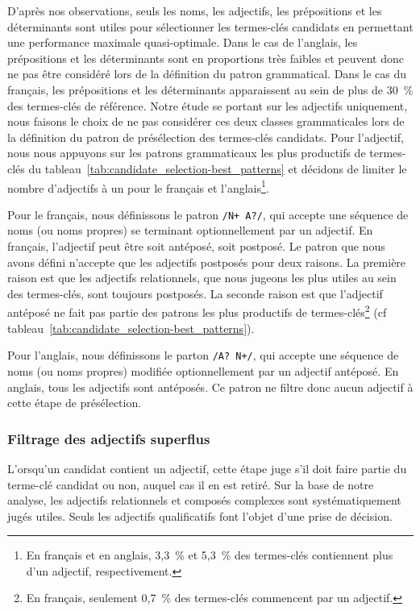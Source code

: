         D'après nos observations, seuls les noms, les adjectifs, les
        prépositions et les déterminants sont utiles pour sélectionner les
        termes-clés candidats en permettant une performance maximale
        quasi-optimale. Dans le cas de l'anglais, les prépositions et les
        déterminants sont en proportions très faibles et peuvent donc ne pas
        être considéré lors de la définition du patron grammatical. Dans le cas
        du français, les prépositions et les déterminants apparaissent au sein
        de plus de 30~\% des termes-clés de référence. Notre étude se portant
        sur les adjectifs uniquement, nous faisons le choix de ne pas considérer
        ces deux classes grammaticales lors de la définition du patron de
        présélection des termes-clés candidats. Pour l'adjectif, nous nous
        appuyons sur les patrons grammaticaux les plus productifs de termes-clés
        du tableau~\ref{tab:candidate_selection-best_patterns} et décidons de
        limiter le nombre d'adjectifs à un pour le français et
        l'anglais\footnote{En français et en anglais, 3,3~\% et 5,3~\% des
        termes-clés contiennent plus d'un adjectif, respectivement.}.
        
        Pour le français, nous définissons le patron \texttt{/N+ A?/}, qui
        accepte une séquence de noms (ou noms propres) se terminant
        optionnellement par un adjectif. En français, l'adjectif peut être soit
        antéposé, soit postposé. Le patron que nous avons défini n'accepte que
        les adjectifs postposés pour deux raisons. La première raison est que
        les adjectifs relationnels, que nous jugeons les
        plus utiles au sein des termes-clés, sont toujours postposés. La seconde
        raison est que l'adjectif antéposé ne fait pas partie des patrons les
        plus productifs de termes-clés\footnote{En français, seulement 0,7~\%
        des termes-clés commencent par un adjectif.} (cf
        tableau~\ref{tab:candidate_selection-best_patterns}).
        
        Pour l'anglais, nous définissons le parton \texttt{/A? N+/}, qui accepte
        une séquence de noms (ou noms propres) modifiée optionnellement par un
        adjectif antéposé. En anglais, tous les adjectifs sont antéposés. Ce
        patron ne filtre donc aucun adjectif à cette étape de présélection.

      \subsubsection{Filtrage des adjectifs superflus}
      \label{subsubsec:main:domain_independent_keyphrase_extraction-keyphrase_candidate_selection-modifiers_filtering-adjective_filtering}
        L'orsqu'un candidat contient un adjectif, cette étape juge s'il doit
        faire partie du terme-clé candidat ou non, auquel cas il  en est retiré.
        Sur la base de notre analyse, les adjectifs relationnels et composés
        complexes sont systématiquement jugés utiles. Seuls les adjectifs
        qualificatifs font l'objet d'une prise de décision.

